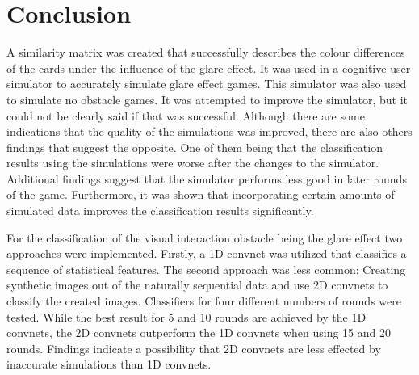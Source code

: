 \chapter{Conclusion}
\label{conclusion}
A similarity matrix was created that successfully describes the colour differences of the cards under the influence of the glare effect. It was used in a cognitive user simulator to accurately simulate glare effect games. This simulator was also used to simulate no obstacle games. It was attempted to improve the simulator, but it could not be clearly said if that was successful. Although there are some indications that the quality of the simulations was improved, there are also others findings that suggest the opposite. One of them being that the classification results using the simulations were worse after the changes to the simulator. Additional findings suggest that the  simulator performs less good in later rounds of the game. Furthermore, it was shown that incorporating certain amounts of simulated data improves the classification results significantly. 

For the classification of the visual interaction obstacle being the glare effect two approaches were implemented. Firstly, a 1D convnet was utilized that classifies a sequence of statistical features. The second approach was less common: Creating synthetic images out of the naturally sequential data and use 2D convnets to classify the created images. Classifiers for four different numbers of rounds were tested. While the best result for 5 and 10 rounds are achieved by the 1D convnets, the 2D convnets outperform the 1D convnets when using 15 and 20 rounds. Findings indicate a possibility that 2D convnets are less effected by inaccurate simulations than 1D convnets. 

